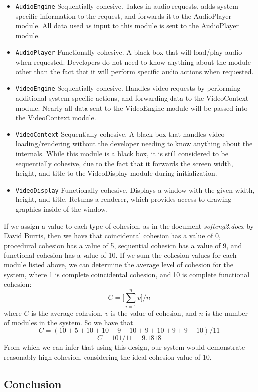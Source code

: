 \documentclass{article}
\begin{document}
\begin{itemize}
        \item \texttt{AudioEngine} Sequentially cohesive. Takes in audio requests, adds system-specific information to the request, and forwards it to the AudioPlayer module. All data used as input to this module is sent to the AudioPlayer module.
        \item \texttt{AudioPlayer} Functionally cohesive. A black box that will load/play audio when requested. Developers do not need to know anything about the module other than the fact that it will perform specific audio actions when requested.
        \item \texttt{VideoEngine} Sequentially cohesive. Handles video requests by performing additional system-specific actions, and forwarding data to the VideoContext module. Nearly all data sent to the VideoEngine module will be passed into the VideoContext module.
        \item \texttt{VideoContext} Sequentially cohesive. A black box that handles video loading/rendering without the developer needing to know anything about the internals. While this module is a black box, it is still considered to be sequentially cohesive, due to the fact that it forwards the screen width, height, and title to the VideoDisplay module during initialization.
        \item \texttt{VideoDisplay} Functionally cohesive. Displays a window with the given width, height, and title. Returns a renderer, which provides access to drawing graphics inside of the window.
			\end{itemize}
			If we assign a value to each type of cohesion, as in the document \emph{softeng2.docx} by David Burris, then we have that coincidental cohesion has a value of 0, procedural cohesion has a value of 5, sequential cohesion has a value of 9, and functional cohesion has a value of 10. If we sum the cohesion values for each module listed above, we can determine the average level of cohesion for the system, where 1 is complete coincidental cohesion, and 10 is complete functional cohesion:
			$$C = \Bigg[\sum_{i=1}^{n}v\Bigg] /n$$
			where $C$ is the average cohesion, $v$ is the value of cohesion, and $n$ is the number of modules in the system. So we have that
			$$C = (10 + 5 + 10 + 10 + 9 + 10 + 9 + 10 + 9 + 9 + 10)/11$$
			$$C = 101/11 = 9.1818$$
			From which we can infer that using this design, our system would demonstrate reasonably high cohesion, considering the ideal cohesion value of 10.
	\subsection{Conclusion}
%
%
\end{document}
